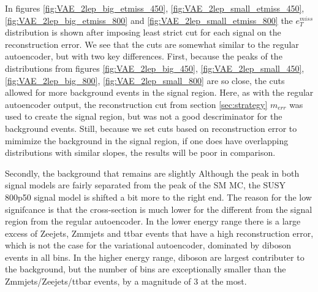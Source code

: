 In figures \ref{fig:VAE_2lep_big_etmiss_450}, \ref{fig:VAE_2lep_small_etmiss_450}, 
\ref{fig:VAE_2lep_big_etmiss_800} and  \ref{fig:VAE_2lep_small_etmiss_800} 
the $e_T^{miss}$ distribution is shown after imposing least strict cut for each signal on the reconstruction error. We see that 
the cuts are somewhat similar to the regular autoencoder, but with two key differences.
First, because the peaks of the distributions from figures \ref{fig:VAE_2lep_big_450}, 
\ref{fig:VAE_2lep_small_450}, \ref{fig:VAE_2lep_big_800}, \ref{fig:VAE_2lep_small_800} 
are so close, the cuts allowed for more background events in the signal region. Here, 
as with the regular autoencoder output, the reconstruction cut from section \ref{sec:strategy} 
$m_{err}$ was used to create the signal region, 
but was not a good descriminator for the background events. Still, because we set 
cuts based on reconstruction error to mimimize the background in the signal region, 
if one does have overlapping distributions with similar slopes, the results will be poor in comparison. \par
Secondly, the background that remains are slightly Although the peak in both
signal models are fairly separated from the peak of the SM MC, the SUSY 800p50 signal model is shifted a
bit more to the right end. The reason for the low signifcance is that the cross-section is much lower for the
different from the signal region from the regular autoencoder. In the lower energy range there 
is a large excess of Zeejets, Zmmjets and ttbar events that have a high reconstruction error, 
which is not the case for the variational autoencoder, dominated by diboson events in all bins. 
In the higher energy range, diboson are largest contributer to the background, but the number 
of bins are exceptionally smaller than the Zmmjets/Zeejets/ttbar events, by a magnitude of 3 at the most. 








